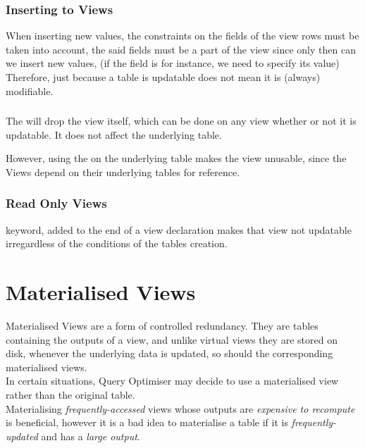 \documentclass[11pt,a4paper,twocolumn]{book}
\begin{document}
\subsubsection{Inserting to Views}

When inserting new values, the constraints on the fields of the view rows must be taken into account, the said fields must be a part of the view since only then can we insert new values, (if the field is  for instance, we need to specify its value) Therefore, just because a table is updatable does not mean it is (always) modifiable.

\subsubsection{}

The  will drop the view itself, which can be done on any view whether or not it is updatable. It does not affect the underlying table.

However, using the  on the underlying table makes the view unusable, since the Views depend on their underlying tables for reference.

\subsubsection{Read Only Views}

 keyword, added to the end of a view declaration makes that view not updatable irregardless of the conditions of the tables creation.

\section{Materialised Views}

Materialised Views are a form of controlled redundancy. They are tables containing the outputs of a view, and unlike virtual views they are stored on disk, whenever the underlying data is updated, so should the corresponding materialised views.\\

In certain situations, Query Optimiser may decide to use a materialised view rather than the original table.\\

Materialising \textit{frequently-accessed} views whose outputs are  \textit{expensive to recompute} is beneficial, however it is a bad idea to materialise a table if it is \textit{frequently-updated} and has a \textit{large output}. \\
\end{document}
